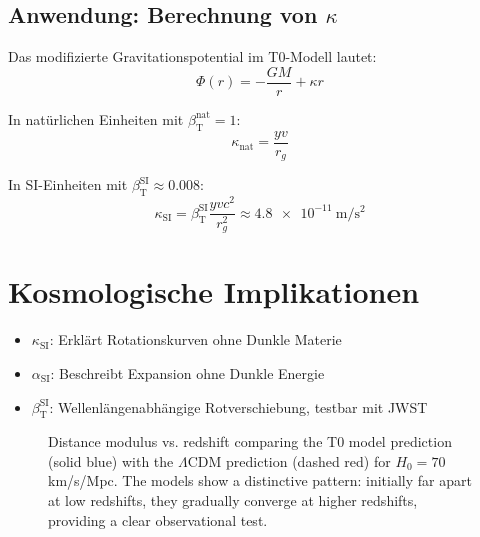 \documentclass[12pt,a4paper]{article}
\newcommand{\betaT}{\beta_{\text{T}}}
\begin{document}
	\subsection{Anwendung: Berechnung von \(\kappa\)}
	
	Das modifizierte Gravitationspotential im T0-Modell lautet:
	\begin{equation}
		\Phi(r) = -\frac{G M}{r} + \kappa r
	\end{equation}
	
	In natürlichen Einheiten mit \(\betaT^{\text{nat}} = 1\):
	\begin{equation}
		\kappa_{\text{nat}} = \frac{y v}{r_g}
	\end{equation}
	
	In SI-Einheiten mit \(\betaT^{\text{SI}} \approx 0.008\):
	\begin{equation}
		\kappa_{\text{SI}} = \betaT^{\text{SI}} \frac{y v c^2}{r_g^2} \approx \SI{4.8e-11}{\meter\per\second\squared}
	\end{equation}
	
	\section{Kosmologische Implikationen}
	
	\begin{itemize}
		\item \(\kappa_{\text{SI}}\): Erklärt Rotationskurven ohne Dunkle Materie
		\item \(\alpha_{\text{SI}}\): Beschreibt Expansion ohne Dunkle Energie
		\item \(\betaT^{\text{SI}}\): Wellenlängenabhängige Rotverschiebung, testbar mit JWST
	\end{itemize}
	
\begin{figure}[ht]
	\centering
	\caption{Distance modulus vs. redshift
		comparing the T0 model prediction (solid blue)
		with the $\Lambda$CDM prediction (dashed red)
		for $H_0 = 70$ km/s/Mpc.
		The models show a distinctive pattern: initially far apart at low redshifts,
		they gradually converge at higher redshifts,
		providing a clear observational test.}
	\label{fig:distance_modulus}
\end{figure}
\end{document}
